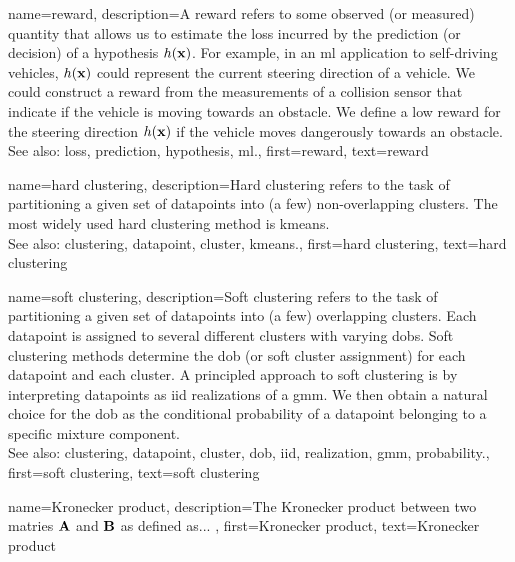 {name={reward}, 
	description={A reward refers to some observed 
		(or measured) quantity that allows us to estimate the \gls{loss} incurred by the \gls{prediction} 
		(or decision) of a \gls{hypothesis} $h({\bf x})$. For example, in an 
		\gls{ml} application to self-driving vehicles, $h({\bf x})$ could represent 
		the current steering direction of a vehicle. We could construct a reward from the 
		measurements of a collision sensor that indicate if the vehicle is moving towards 
		an obstacle. We define a low reward for the steering direction 
		$h({\bf x})$ if the vehicle moves dangerously towards an obstacle.
			\\
		See also: \gls{loss}, \gls{prediction}, \gls{hypothesis}, \gls{ml}.},
	first={reward}, 
	text={reward}
} 

{name={hard clustering}, 
	description={Hard \gls{clustering} 
		refers to the task of partitioning a given set of \glspl{datapoint} into (a few) non-overlapping \glspl{cluster}. 
		The most widely used hard \gls{clustering} method is \gls{kmeans}.
				\\
		See also: \gls{clustering}, \gls{datapoint}, \gls{cluster}, \gls{kmeans}.},
	first={hard clustering},
	text={hard clustering} 
}
	
{name={soft clustering}, 
	description={Soft \gls{clustering} 
		refers to the task of partitioning a given set of \glspl{datapoint} into (a few) overlapping \glspl{cluster}. 
		Each \gls{datapoint} is assigned to several different \glspl{cluster} with varying \glspl{dob}. Soft \gls{clustering} 
		methods determine the \gls{dob} (or soft \gls{cluster} assignment) for each \gls{datapoint} and each \gls{cluster}.
		A principled approach to soft \gls{clustering} is by interpreting \glspl{datapoint} as \gls{iid} \glspl{realization} 
		of a \gls{gmm}. We then obtain a natural choice for the \gls{dob} as the conditional 
		\gls{probability} of a \gls{datapoint} belonging to a specific mixture component.
				\\
		See also: \gls{clustering}, \gls{datapoint}, \gls{cluster}, \gls{dob}, \gls{iid}, \gls{realization}, \gls{gmm}, \gls{probability}.},
	first={soft clustering},
	text={soft clustering} 
}


{name={Kronecker product}, 
	description={The Kronecker product between two matries ${\bf A}$ and ${\bf B}$ as 
		defined as... 
		},
	first={Kronecker product},
	text={Kronecker product} 
}

